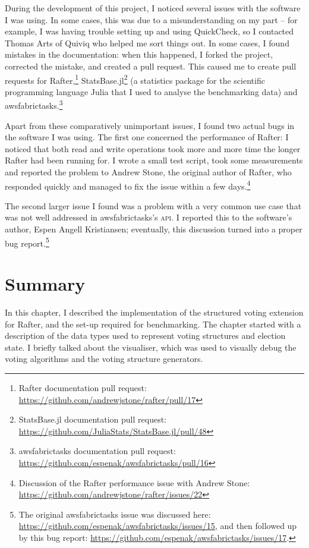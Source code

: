 \documentclass[11pt,chapterprefix=true,toc=bibliography,numbers=noendperiod,
               footnotes=multiple,twoside]{scrreprt}
\begin{document}
During the development of this project, I noticed several issues with the software I was using. In some cases, this was due to a misunderstanding on my part -- for example, I was having trouble setting up and using QuickCheck, so I contacted Thomas Arts of Quiviq who helped me sort things out. In some cases, I found mistakes in the documentation: when this happened, I forked the project, corrected the mistake, and created a pull request. This caused me to create pull requests for Rafter,\footnote{Rafter documentation pull request: \url{https://github.com/andrewjstone/rafter/pull/17}} StatsBase.jl\footnote{StatsBase.jl documentation pull request: \url{https://github.com/JuliaStats/StatsBase.jl/pull/48}} (a statistics package for the scientific programming language Julia that I used to analyse the benchmarking data) and awsfabrictasks.\footnote{awsfabrictasks documentation pull request: \url{https://github.com/espenak/awsfabrictasks/pull/16}}

Apart from these comparatively unimportant issues, I found two actual bugs in the software I was using. The first one concerned the performance of Rafter: I noticed that both read and write operations took more and more time the longer Rafter had been running for. I wrote a small test script, took some measurements and reported the problem to Andrew Stone, the original author of Rafter, who responded quickly and managed to fix the issue within a few days.\footnote{Discussion of the Rafter performance issue with Andrew Stone: \url{https://github.com/andrewjstone/rafter/issues/22}}

The second larger issue I found was a problem with a very common use case that was not well addressed in awsfabrictasks's \textsc{api}. I reported this to the software's author, Espen Angell Kristiansen; eventually, this discussion turned into a proper bug report.\footnote{The original awsfabrictasks issue was discussed here: \url{https://github.com/espenak/awsfabrictasks/issues/15}, and then followed up by this bug report: \url{https://github.com/espenak/awsfabrictasks/issues/17}.}

\section{Summary}

In this chapter, I described the implementation of the structured voting extension for Rafter, and the set-up required for benchmarking. The chapter started with a description of the data types used to represent voting structures and election state. I briefly talked about the visualiser, which was used to visually debug the voting algorithms and the voting structure generators.
\end{document}
